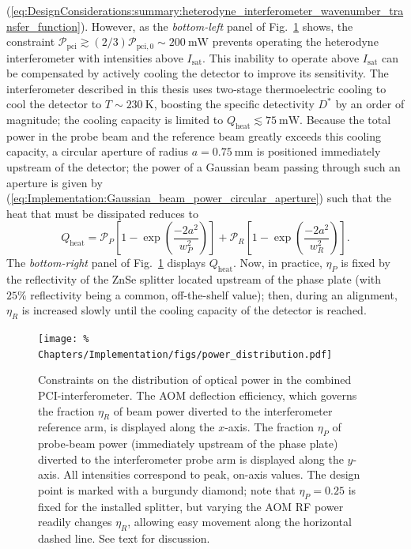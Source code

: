 (\ref{eq:DesignConsiderations:summary:heterodyne_interferometer_wavenumber_transfer_function}).
However, as the \emph{bottom-left} panel of
Fig.~\ref{fig:Implementation:power_distribution} shows,
the constraint
$\mathcal{P}_{\text{pci}}
\gtrsim
(2 / 3) \mathcal{P}_{\text{pci},0}
\sim \SI{200}{\milli\watt}$
prevents operating the heterodyne interferometer
with intensities above $I_{\text{sat}}$.
This inability to operate above $I_{\text{sat}}$ can be compensated
by actively cooling the detector to improve its sensitivity.
The interferometer described in this thesis
uses two-stage thermoelectric cooling
to cool the detector to $T \sim \SI{230}{\kelvin}$,
boosting the specific detectivity $D^*$ by an order of magnitude;
the cooling capacity is limited to
$Q_{\text{heat}} \lesssim \SI{75}{\milli\watt}$.
Because the total power in the probe beam and the reference beam
greatly exceeds this cooling capacity,
a circular aperture of radius $a = \SI{0.75}{\milli\meter}$
is positioned immediately upstream of the detector;
the power of a Gaussian beam passing through such an aperture is given by
(\ref{eq:Implementation:Gaussian_beam_power_circular_aperture})
such that the heat that must be dissipated reduces to
\begin{equation}
  Q_{\text{heat}}
  =
  \mathcal{P}_P
  \left[ 1 - \exp\left( \frac{-2 a^2}{w_P^2} \right) \right]
  +
  \mathcal{P}_R
  \left[ 1 - \exp\left( \frac{-2 a^2}{w_R^2} \right) \right].
\end{equation}
The \emph{bottom-right} panel of
Fig.~\ref{fig:Implementation:power_distribution}
displays $Q_{\text{heat}}$.
Now, in practice, $\eta_P$ is fixed by the reflectivity
of the ZnSe splitter located upstream of the phase plate
(with $25\%$ reflectivity being a common, off-the-shelf value);
then, during an alignment, $\eta_R$ is increased slowly
until the cooling capacity of the detector is reached.

\begin{figure}
  \centering
  \texttt{[image: \%
    Chapters/Implementation/figs/power\_distribution.pdf]}
  \caption[Constraints on the distribution of optical power]{%
    Constraints on the distribution of optical power
    in the combined PCI-interferometer.
    The AOM deflection efficiency,
    which governs the fraction $\eta_R$
    of beam power diverted to the interferometer reference arm,
    is displayed along the $x$-axis.
    The fraction $\eta_P$ of probe-beam power
    (immediately upstream of the phase plate)
    diverted to the interferometer probe arm
    is displayed along the $y$-axis.
    All intensities correspond to peak, on-axis values.
    The design point is marked with a burgundy diamond;
    note that $\eta_P = 0.25$ is fixed for the installed splitter, but
    varying the AOM RF power readily changes $\eta_R$,
    allowing easy movement along the horizontal dashed line.
    See text for discussion.
  }
\label{fig:Implementation:power_distribution}
\end{figure}



